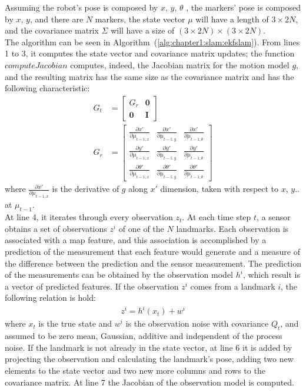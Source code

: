 Assuming the robot's pose is composed by $x$, $y$, $\theta$ , the markers' pose is composed by $x$, $y$, and there are $N$ markers, the state vector $\mu$ will have a length of $3 \times 2N$, and the covariance matrix $\Sigma$ will have a size of $(3 \times 2N) \times (3 \times 2N)$.\\

The algorithm can be seen in Algorithm~(\ref{alg:chapter1:slam:ekfslam}). From lines 1 to 3, it computes the state vector and covariance matrix updates; the function $computeJacobian$ computes, indeed, the Jacobian matrix for the motion model $g$, and the resulting matrix has the same size as the covariance matrix and has the following characteristic:
\begin{align}
   G_t &= \begin{bmatrix}
        G_r & \textbf{0} \\
        \textbf{0} & \textbf{I}
    \end{bmatrix}\\
    G_r &= \begin{bmatrix}
    \frac{\partial x'}{\partial \mu_{t-1,x}} & \frac{\partial x'}{\partial \mu_{t-1,y}} & \frac{\partial x'}{\partial \mu_{t-1,\theta}}\\
    \frac{\partial y'}{\partial \mu_{t-1,x}} & \frac{\partial y'}{\partial \mu_{t-1,y}} & \frac{\partial y'}{\partial \mu_{t-1,\theta}}\\
    \frac{\partial \theta'}{\partial \mu_{t-1,x}} & \frac{\partial \theta'}{\partial \mu_{t-1,y}} & \frac{\partial \theta'}{\partial \mu_{t-1,\theta}}
\end{bmatrix}
\end{align}
where $\frac{\partial x'}{\partial \mu_{t-1,x}}$ is the derivative of $g$ along $x'$ dimension, taken with respect to $x$, $y$.. at $\mu_{t-1}$.\\

At line 4, it iterates through every observation $z_t$. At each time step $t$, a sensor obtains a set of observations $z^i$ of one of the $N$ landmarks. Each observation is associated with a map feature, and this association is accomplished by a prediction of the measurement that each feature would generate and a measure of the difference between the prediction and the sensor measurement. The prediction of the measurements can be obtained by the observation model $h^i$, which result is a vector of predicted features. If the observation $z^i$ comes from a landmark $i$, the following relation is hold:
\begin{align}
    z^i = h^i\left(x_t\right) + w^i
\end{align}
where $x_t$ is the true state and $w^i$ is the observation noise with covariance $Q_t$, and assumed to be zero mean, Gaussian, additive and independent of the process noise. If the landmark is not already in the state vector, at line 6 it is added by projecting the observation and calculating the landmark's pose, adding two new elements to the state vector and two new more columns and rows to the covariance matrix. At line 7 the Jacobian of the observation model is computed.\\

